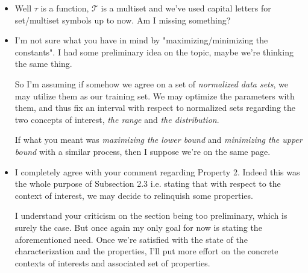 \documentclass{article}
\newcommand{\ssset}{\mathcal{T}}   %
\begin{document}
\begin{itemize} 
\item {\color{blue} Well $\tau$ is a function, $\ssset$ is a multiset and we've used capital letters for set/multiset symbols up to now. Am I missing something?
}
\end{itemize}
\begin{center}
\end{center}

\begin{itemize} 
\item {\color{blue} I'm not sure what you have in mind by "maximizing/minimizing the constants". I had some preliminary idea on the topic, maybe we're thinking the same thing.

So I'm assuming if somehow we agree on a set of \emph{normalized data sets}, we may utilize them as our training set. We may optimize the parameters with them, and thus fix an interval with respect to normalized sets regarding the two concepts of interest, \emph{the range} and \emph{the distribution}. 

If what you meant was \emph{maximizing the lower bound} and \emph{minimizing the upper bound} with a similar process, then I suppose we're on the same page.
}
\end{itemize}
\begin{center}
\end{center}
\begin{center}
\end{center}

\begin{itemize} 
\item {\color{blue} I completely agree with your comment regarding Property 2. Indeed this was the whole purpose of Subsection 2.3 i.e. stating that with respect to the context of interest, we may decide to relinquish some properties.

I understand your criticism on the section being too preliminary, which is surely the case. But once again my only goal for now is stating the aforementioned need. Once we're satisfied with the state of the characterization and the properties, I'll put more effort on the concrete contexts of interests and associated set of properties.
}
\end{itemize}
\begin{center}
\end{center}
\end{document}
